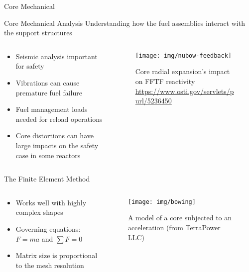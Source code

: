 \documentclass[pdf,aspectratio=169]{beamer}
\begin{document}
\begin{frame}[plain,c]
	\begin{center}
	\Huge Core Mechanical
	\end{center}
\end{frame}

\begin{frame}{Core Mechanical Analysis}
    Understanding how the fuel assemblies interact with the support structures
    \begin{columns}
    \begin{column}{0.5\textwidth}
        \begin{itemize}
            \item Seismic analysis important for safety
            \item Vibrations can cause premature fuel failure
            \item Fuel management loads needed for reload operations
            \item Core distortions can have large impacts on the safety case in some
                reactors
        \end{itemize}
    \end{column}
    \begin{column}{0.5\textwidth}
        \begin{figure}[ht]
        \centering
            \texttt{[image: img/nubow-feedback]}
            \caption{\tiny Core radial expansion's impact on FFTF reactivity
            \url{https://www.osti.gov/servlets/purl/5236450} }
        \end{figure}
    \end{column}
\end{columns}
\end{frame}

\begin{frame}{The Finite Element Method}
    \begin{columns}
    \begin{column}{0.5\textwidth}
        \begin{itemize}
            \item Works well with highly complex shapes
            \item Governing equations: $F = ma$ and  $\sum{F} = 0$ 
            \item Matrix size is proportional to the mesh resolution
        \end{itemize}
    \end{column}
    \begin{column}{0.5\textwidth}
        \begin{figure}[ht]
        \centering
            \texttt{[image: img/bowing]}
            \caption{\tiny A model of a core subjected to an acceleration
            (from TerraPower LLC) }
        \end{figure}
    \end{column}
\end{columns}
\end{frame}
\end{document}
